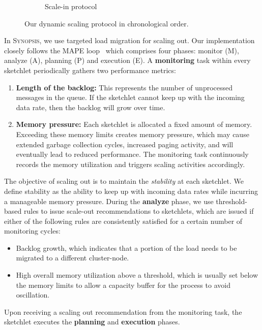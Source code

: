 \begin{figure}[h!]
\begin{subfigure}{0.45\textwidth}
                \caption{Scale-in protocol}
                \label{fig:scale-in-protocol}
        \end{subfigure}
        \caption{Our dynamic scaling protocol in chronological order.}
        \label{fig:dynamic-scaling-protocols}
\end{figure}

In \textsc{Synopsis}, we use targeted load migration for scaling out.
Our implementation closely follows the MAPE loop~\cite{maurer2011revealing} which comprises four phases: monitor (M), analyze (A), planning (P) and execution (E).
A \textbf{monitoring} task within every sketchlet periodically gathers two performance metrics:
\begin{enumerate}[leftmargin=*]
	\item \textbf{Length of the backlog:} This represents the number of unprocessed messages in the queue. If the sketchlet cannot keep up with the incoming data rate, then the backlog will grow over time.
	\item \textbf{Memory pressure:} Each sketchlet is allocated a fixed amount of memory. 
	Exceeding these memory limits creates memory pressure, which may cause extended garbage collection cycles, increased paging activity, and will eventually lead to reduced performance.
	The monitoring task continuously records the memory utilization and triggers scaling activities accordingly.
\end{enumerate} 

The objective of scaling out is to maintain the \emph{stability} at each sketchlet.
We define stability as the ability to keep up with incoming data rates while incurring a manageable memory pressure.  During the \textbf{analyze} phase, we use threshold-based rules \cite{lorido2012auto} to issue scale-out recommendations to sketchlets, which are issued if either of the following rules are consistently satisfied for a certain number of monitoring cycles:
\begin{itemize}[leftmargin=*]  
\item Backlog growth, which indicates that a portion of the load needs to be migrated to a different cluster-node.
\item High overall memory utilization above a threshold, which is usually set below the memory limits to allow a capacity buffer for the process to avoid oscillation.
\end{itemize}
Upon receiving a scaling out recommendation from the monitoring task, the sketchlet executes the \textbf{planning} and \textbf{execution} phases.

